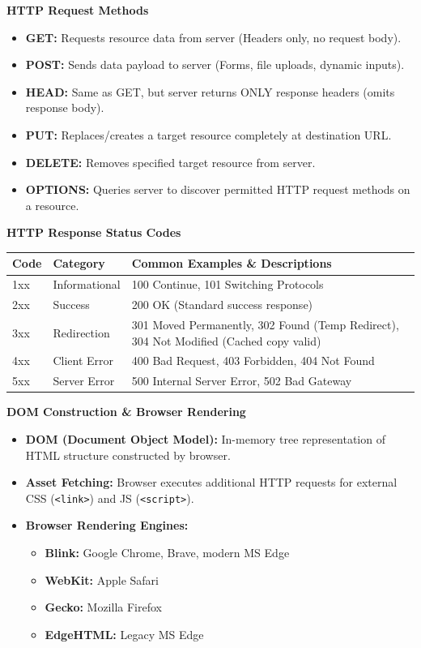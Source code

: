 \documentclass[8pt, a4paper]{article}
\begin{document}
\begin{conceptbox}
\textbf{HTTP Request Methods}
\begin{itemize}
  \item \textbf{GET:} Requests resource data from server (Headers only, no request body).
  \item \textbf{POST:} Sends data payload to server (Forms, file uploads, dynamic inputs).
  \item \textbf{HEAD:} Same as GET, but server returns ONLY response headers (omits response body).
  \item \textbf{PUT:} Replaces/creates a target resource completely at destination URL.
  \item \textbf{DELETE:} Removes specified target resource from server.
  \item \textbf{OPTIONS:} Queries server to discover permitted HTTP request methods on a resource.
\end{itemize}
\end{conceptbox}

\begin{conceptbox}
\textbf{HTTP Response Status Codes}

\smallskip
\begin{tabularx}{\linewidth}{l l X}
  \toprule
  \textbf{Code} & \textbf{Category} & \textbf{Common Examples \& Descriptions} \\
  \midrule
  1xx & Informational & 100 Continue, 101 Switching Protocols \\
  2xx & Success       & 200 OK (Standard success response) \\
  3xx & Redirection   & 301 Moved Permanently, 302 Found (Temp Redirect), 304 Not Modified (Cached copy valid) \\
  4xx & Client Error  & 400 Bad Request, 403 Forbidden, 404 Not Found \\
  5xx & Server Error  & 500 Internal Server Error, 502 Bad Gateway \\
  \bottomrule
\end{tabularx}
\end{conceptbox}

\begin{conceptbox}
\textbf{DOM Construction \& Browser Rendering}
\begin{itemize}
  \item \textbf{DOM (Document Object Model):} In-memory tree representation of HTML structure constructed by browser.
  \item \textbf{Asset Fetching:} Browser executes additional HTTP requests for external CSS (\texttt{<link>}) and JS (\texttt{<script>}).
  \item \textbf{Browser Rendering Engines:}
  \begin{itemize}
    \item \textbf{Blink:} Google Chrome, Brave, modern MS Edge
    \item \textbf{WebKit:} Apple Safari
    \item \textbf{Gecko:} Mozilla Firefox
    \item \textbf{EdgeHTML:} Legacy MS Edge
  \end{itemize}
\end{itemize}
\end{conceptbox}
\end{document}
